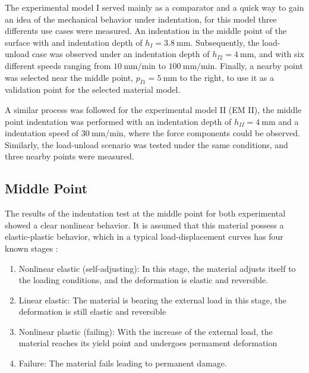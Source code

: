 The experimental model I served mainly as a comparator and a quick way to gain an idea of the 
mechanical behavior under indentation, for this model three differents use cases were measured. 
An indentation in the middle point of the surface with and indentation depth of $h_{I} = \SI{3.8}{\milli \m}$. 
Subsequently, the load-unload case was observed under an indentation depth of  $h_{I2} = \SI{4}{\milli \m}$, and 
with six different speeds ranging from $\SI[per-mode = symbol]{10}{\milli \m\per \minute}$ to 
$\SI[per-mode = symbol]{100}{\milli \m\per \minute}$. 
Finally, a nearby point was selected near the middle point, $p_{I1} = \SI{5}{\milli \m}$ to the right,
 to use it as a validation point for the selected material model. 

A similar process was followed for the experimental model II (EM II), the middle point indentation was 
performed with an indentation depth of $h_{II} = \SI{4}{\milli \m}$ and a indentation 
speed of $\SI[per-mode = symbol]{30}{\milli \m\per \minute}$, where the force components 
could be observed. Similarly, the load-unload scenario was tested under the same conditions, and three 
nearby points were measured.

\subsection{Middle Point}
\label{subsection:midpointresult}
The results of the indentation test at the middle point for both experimental showed a clear 
nonlinear behavior.  It is assumed that this material 
possess a elastic-plastic behavior, which in a typical load-displacement curves has four known stages \cite{Goharian2017}:

\begin{enumerate}
    \item Nonlinear elastic (self-adjusting): In this stage, the material adjusts itself to the loading conditions, and the deformation is elastic and reversible.
    \item Linear elastic: The material is bearing the external load in this stage, the deformation is still elastic and reversible 
    \item Nonlinear plastic (failing): With the increase of the external load, the material reaches its yield point and undergoes permament deformation
    \item Failure: The material fails leading to permanent damage.
\end{enumerate}


